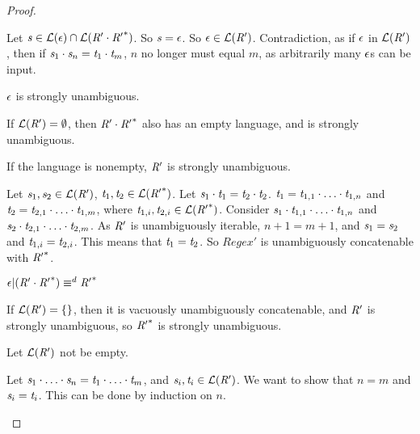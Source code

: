 \documentclass[numbers,10pt,preprint\ifanon ,nocopyrightspace\fi]{sigplanconf}
\begin{document}
\begin{proof}
\begin{case}
    Let $\mathit{s} \in \mathcal{L}(\epsilon) \cap \mathcal{L}(\mathit{R}'
      \cdot {\ensuremath{\mathit{R}}'}^*)$.
    So $\mathit{s} = \epsilon$.
    So $\epsilon \in \mathcal{L}(\mathit{R}')$.
    Contradiction, as if $\epsilon$ in $\mathcal{L}(\mathit{R}')$, then
    if $\mathit{s}_1\cdot\mathit{s}_n = \mathit{t}_1\cdot\mathit{t}_m$, $n$ no
    longer must equal $m$, as arbitrarily many $\epsilon$s can be input.

    $\epsilon$ is strongly unambiguous.

    If $\mathcal{L}(\mathit{R}') = \emptyset$, then
    $\mathit{R}' \cdot {\ensuremath{\mathit{R}}'}^*$ also has an empty language, and is
    strongly unambiguous.

    If the language is nonempty, $\mathit{R}'$ is strongly unambiguous.

    Let $\mathit{s}_1,\mathit{s}_2 \in
    \mathcal{L}(\mathit{R}')$, $\mathit{t}_1,\mathit{t}_2 \in
    \mathcal{L}({\mathit{R}'}^*)$.  Let $\mathit{s}_1\cdot\mathit{t}_1 =
    \mathit{t}_2\cdot\mathit{t}_2$.
    $\mathit{t}_1 = \mathit{t}_{1,1}\cdot\ldots\cdot\mathit{t}_{1,n}$ and
    $\mathit{t}_2 = \mathit{t}_{2,1}\cdot\ldots\cdot\mathit{t}_{1,m}$, where
    $\mathit{t}_{1,i},\mathit{t}_{2,i}\in\mathcal{L}({\mathit{R}'}^*)$.
    Consider
    $\mathit{s}_1\cdot\mathit{t}_{1,1}\cdot\ldots\cdot\mathit{t}_{1,n}$
    and
    $\mathit{s}_2\cdot\mathit{t}_{2,1}\cdot\ldots\cdot\mathit{t}_{2,m}$.
    As $\mathit{R}'$ is unambiguously iterable, $n+1=m+1$, and
    $\mathit{s}_1 = \mathit{s}_2$ and $\mathit{t}_{1,i} = \mathit{t}_{2,i}$.
    This means that $\mathit{t}_1 = \mathit{t}_2$.
    So $Regex'$ is unambiguously concatenable with ${\mathit{R}'}^*$.
  \end{case}

  \begin{case}
    $\epsilon | (\mathit{R}' \cdot {\ensuremath{\mathit{R}}'}^*) \equiv^d
    {\mathit{R}'}^*$

    If $\mathcal{L}(\mathit{R}') = \{\}$, then it is vacuously unambiguously
    concatenable, and $\mathit{R}'$ is strongly unambiguous, so ${\mathit{R}'}^*$
    is strongly unambiguous.

    Let $\mathcal{L}(\mathit{R}')$ not be empty.

    Let $\mathit{s}_1\cdot\ldots\cdot\mathit{s}_n =
    \mathit{t}_1\cdot\ldots\cdot\mathit{t}_m$, and
    $\mathit{s}_i,\mathit{t}_i\in\mathcal{L}(\mathit{R}')$.  We want to show that $n=m$
    and $\mathit{s}_i=\mathit{t}_i$.
    This can be done by induction on $n$.


\end{case}
\end{proof}
\end{document}
